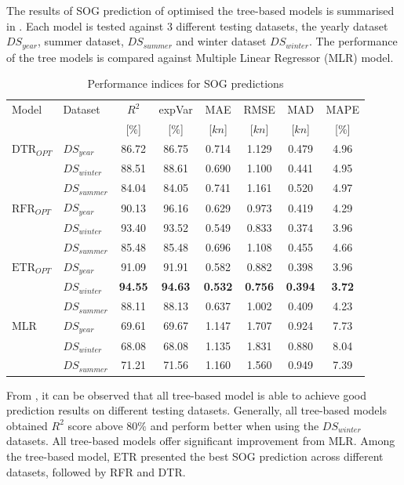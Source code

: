 The results of SOG prediction of optimised the tree-based models is summarised in . Each model is tested against 3 different testing datasets, the yearly dataset $DS_{year}$, summer dataset, $DS_{summer}$ and winter dataset $DS_{winter}$. The performance of the tree models is compared against Multiple Linear Regressor (MLR) model.

\begin{table}[ht]
    \small
    \centering
    {\begin{tabular}{ l l c c c c c c }
    \hline
    Model & Dataset & $R^2$ & expVar & MAE & RMSE & MAD & MAPE \\
    & & [$\%$] & [$\%$] & [$kn$] & [$kn$] & [$kn$] & [$\%$]  \\ 
    \hline
    $\text{DTR}_{OPT}$ & $DS_{year}$ & 86.72 & 86.75 & 0.714 & 1.129  & 0.479 & 4.96  \\
    & $DS_{winter}$ & 88.51 & 88.61 & 0.690 & 1.100 & 0.441 & 4.95 \\
    & $DS_{summer}$ & 84.04 & 84.05 & 0.741 & 1.161 & 0.520 & 4.97 \\
    $\text{RFR}_{OPT}$ & $DS_{year}$  & 90.13 & 96.16 & 0.629 & 0.973 & 0.419 & 4.29 \\
    & $DS_{winter}$ & 93.40 & 93.52 & 0.549 & 0.833 & 0.374 & 3.96 \\
    & $DS_{summer}$ & 85.48 & 85.48 & 0.696 & 1.108 & 0.455 & 4.66 \\
    $\text{ETR}_{OPT}$ & $DS_{year}$ & 91.09 & 91.91 & 0.582 & 0.882 & 0.398 & 3.96 \\
    & $DS_{winter}$ & \textbf{94.55} & \textbf{94.63} & \textbf{0.532} & \textbf{0.756} & \textbf{0.394} & \textbf{3.72} \\
    & $DS_{summer}$ & 88.11 & 88.13 & 0.637 & 1.002 & 0.409 & 4.23 \\
    MLR & $DS_{year}$ & 69.61 & 69.67 & 1.147 & 1.707 & 0.924 & 7.73 \\
    & $DS_{winter}$ & 68.08 & 68.08 & 1.135 & 1.831 & 0.880 & 8.04 \\
    & $DS_{summer}$ & 71.21 & 71.56 & 1.160 & 1.560 & 0.949 & 7.39 \\
    \hline
    \end{tabular}}
\caption{Performance indices for SOG predictions}\label{tbl:testing_dataset_sog_result}
\end{table}

From , it can be observed that all tree-based model is able to achieve good prediction results on different testing datasets. Generally, all tree-based models obtained $R^2$ score above $80\%$ and perform better when using the $DS_{winter}$ datasets. All tree-based models offer significant improvement from MLR. Among the tree-based model, ETR presented the best SOG prediction across different datasets, followed by RFR and DTR.\\ 

